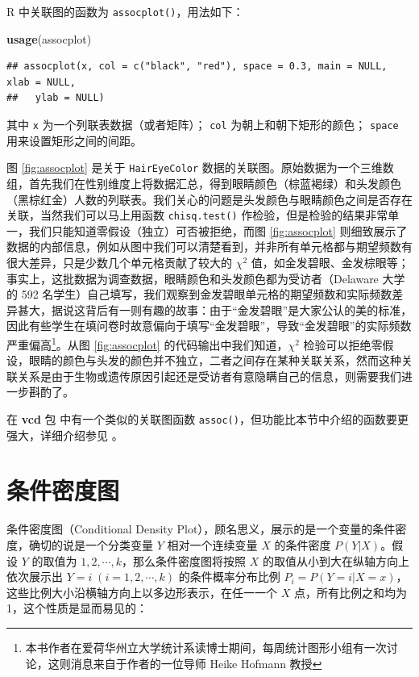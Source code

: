 \documentclass[
  b5paper,
  UTF8,twoside]{book}
\newenvironment{Shaded}{\begin{snugshade}}{\end{snugshade}}
\newcommand{\FunctionTok}[1]{\textcolor[rgb]{0.13,0.29,0.53}{\textbf{#1}}}
\newcommand{\NormalTok}[1]{#1}
\begin{document}
R 中关联图的函数为 \texttt{assocplot()}，用法如下：

\begin{Shaded}
\begin{Highlighting}[]
\FunctionTok{usage}\NormalTok{(assocplot)}
\end{Highlighting}
\end{Shaded}

\begin{verbatim}
## assocplot(x, col = c("black", "red"), space = 0.3, main = NULL, xlab = NULL,
##   ylab = NULL)
\end{verbatim}

其中 \texttt{x} 为一个列联表数据（或者矩阵）； \texttt{col} 为朝上和朝下矩形的颜色； \texttt{space} 用来设置矩形之间的间距。

图 \ref{fig:assocplot}
是关于 \texttt{HairEyeColor} 数据的关联图。原始数据为一个三维数组，首先我们在性别维度上将数据汇总，得到眼睛颜色（棕蓝褐绿）和头发颜色（黑棕红金）人数的列联表。我们关心的问题是头发颜色与眼睛颜色之间是否存在关联，当然我们可以马上用函数 \texttt{chisq.test()} 作检验，但是检验的结果非常单一，我们只能知道零假设（独立）可否被拒绝，而图 \ref{fig:assocplot} 则细致展示了数据的内部信息，例如从图中我们可以清楚看到，并非所有单元格都与期望频数有很大差异，只是少数几个单元格贡献了较大的 \(\chi^{2}\) 值，如金发碧眼、金发棕眼等；事实上，这批数据为调查数据，眼睛颜色和头发颜色都为受访者（Delaware 大学的 592 名学生）自己填写，我们观察到金发碧眼单元格的期望频数和实际频数差异甚大，据说这背后有一则有趣的故事：由于``金发碧眼''是大家公认的美的标准，因此有些学生在填问卷时故意偏向于填写``金发碧眼''，导致``金发碧眼''的实际频数严重偏高\footnote{本书作者在爱荷华州立大学统计系读博士期间，每周统计图形小组有一次讨论，这则消息来自于作者的一位导师 Heike Hofmann 教授}。从图 \ref{fig:assocplot} 的代码输出中我们知道，\(\chi^{2}\) 检验可以拒绝零假设，眼睛的颜色与头发的颜色并不独立，二者之间存在某种关联关系，然而这种关联关系是由于生物或遗传原因引起还是受访者有意隐瞒自己的信息，则需要我们进一步斟酌了。

在 \textbf{vcd} 包 \citep{vcd} 中有一个类似的关联图函数 \texttt{assoc()}，但功能比本节中介绍的函数要更强大，详细介绍参见 \citeauthor{Meyer06} \citetext{\citeyear{Meyer06}; \citealp{Zeileis07}}。

\section{条件密度图}\label{sec:cdplot}

条件密度图（Conditional Density Plot），顾名思义，展示的是一个变量的条件密度，确切的说是一个分类变量 \(Y\) 相对一个连续变量 \(X\) 的条件密度 \(P(Y|X)\)。假设 \(Y\) 的取值为 \(1,2,\cdots,k\)，那么条件密度图将按照 \(X\) 的取值从小到大在纵轴方向上依次展示出 \(Y=i\;(i=1,2,\cdots,k)\) 的条件概率分布比例 \(P_{i}=P(Y=i|X=x)\)，这些比例大小沿横轴方向上以多边形表示，在任一一个 \(X\) 点，所有比例之和均为 1，这个性质是显而易见的：
\end{document}
